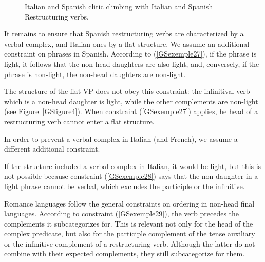 \documentclass[output=paper
                ,modfonts
                ,nonflat
	        ,collection
	        ,collectionchapter
	        ,collectiontoclongg
 	        ,biblatex
                ,babelshorthands
                ,newtxmath
                ,draftmode
                ,colorlinks, citecolor=brown
]{./langsci/langscibook}
\begin{document}
{\begin{figure}
\begin{subfigure}[b]{\textwidth}
\label{GSfigure6b}
\end{subfigure}
\caption{Italian and Spanish clitic climbing with Italian and Spanish Restructuring verbs.}
\label{GSfigure6}
\end{figure}

It remains to ensure that Spanish restructuring verbs are characterized by a verbal complex, and Italian ones by a flat structure. We assume an additional constraint on phrases in Spanish. According to (\ref{GSexemple27}), if the phrase is light, it follows that the non-head daughters are also light, and, conversely, if the phrase is non-light, the non-head daughters are non-light.

\begin{exe}
\end{exe}
The structure of the flat VP does not obey this constraint: the infinitival verb which is a non-head daughter is light, while the other complements are non-light (see Figure~\ref{GSfigure4}). When constraint (\ref{GSexemple27}) applies, he head of a restructuring verb cannot enter a flat structure. 

In order to prevent a verbal complex in Italian (and French), we assume a different additional constraint.

\begin{exe}
\end{exe}

If the structure included a verbal complex in Italian, it would be light, but this is not possible because constraint (\ref{GSexemple28}) says that the non-daughter in a light phrase cannot be verbal, which excludes the participle or the infinitive.

Romance languages follow the general constraints on ordering in non-head final languages. According to constraint (\ref{GSexemple29}), the verb precedes the complements it subcategorizes for. This is relevant not only for the head of the complex predicate, but also for the participle complement of the tense auxiliary or the infinitive complement of a restructuring verb. Although the latter do not combine with their expected complements, they still subcategorize for them.  

}
\end{document}
